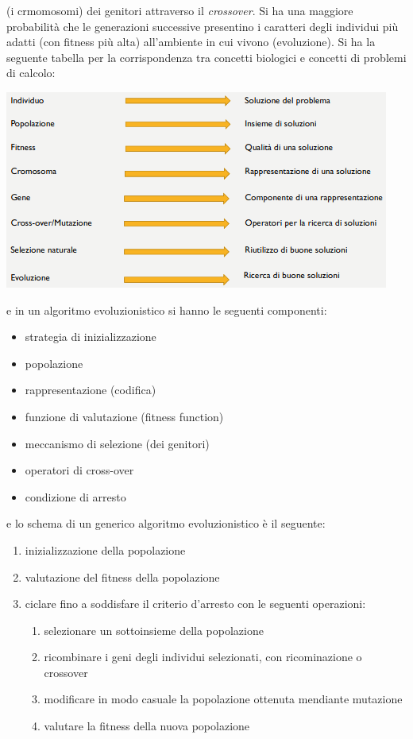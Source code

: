 \message{ !name(ro.tex)}\documentclass[a4paper,12pt, oneside]{book}
\begin{document}
(i crmomosomi) dei genitori attraverso il
\textit{crossover}. Si ha una maggiore probabilità che le generazioni
successive presentino i caratteri degli individui più adatti (con
fitness più alta) all’ambiente in cui vivono (evoluzione). Si ha la
seguente tabella per la corrispondenza tra concetti biologici e
concetti di problemi di calcolo:
\begin{center}
  \includegraphics[scale = 0.7]{img/bio.png}
\end{center}
e in un algoritmo evoluzionistico si hanno le seguenti componenti:
\begin{itemize}
  \item strategia di inizializzazione
  \item popolazione
  \item rappresentazione (codifica)
  \item funzione di valutazione (fitness function)
  \item meccanismo di selezione (dei genitori)
  \item operatori di cross-over
  \item condizione di arresto
\end{itemize}
e lo schema di un generico algoritmo evoluzionistico è il seguente:
\begin{enumerate}
  \item inizializzazione della popolazione
  \item valutazione del fitness della popolazione
  \item ciclare fino a soddisfare il criterio d'arresto con le
  seguenti operazioni:
  \begin{enumerate}
    \item selezionare un sottoinsieme della popolazione
    \item ricombinare i geni degli individui selezionati, con
    ricominazione o crossover
    \item modificare in modo casuale la popolazione ottenuta mendiante
    mutazione
    \item valutare la fitness della nuova popolazione
  \end{enumerate}
\end{enumerate}
\end{document}
